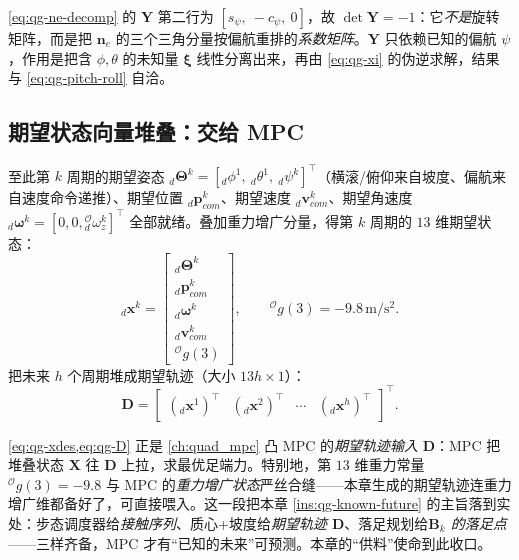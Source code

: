 \begin{note}\label{note:qg-ocr-Y}
\cref{eq:qg-ne-decomp} 的 $\mathbf{Y}$ 第二行为 $[s_\psi,\ -c_\psi,\ 0]$，故 $\det\mathbf{Y}=-1$：它\emph{不是}旋转矩阵，而是把 $\boldsymbol{n}_e$ 的三个三角分量按偏航重排的\emph{系数矩阵}。$\mathbf{Y}$ 只依赖已知的偏航 $\psi$，作用是把含 $\phi,\theta$ 的未知量 $\boldsymbol{\xi}$ 线性分离出来，再由 \cref{eq:qg-xi} 的伪逆求解，结果与 \cref{eq:qg-pitch-roll} 自洽。
\end{note}

\subsection{期望状态向量堆叠：交给 MPC}
\label{subsec:qg-stack}

至此第 $k$ 周期的期望姿态 ${}_d\boldsymbol{\Theta}^{k}=[{}_d\phi^{1},\ {}_d\theta^{1},\ {}_d\psi^{k}]^\top$（横滚/俯仰来自坡度、偏航来自速度命令递推）、期望位置 ${}_d\boldsymbol{p}_{com}^{k}$、期望速度 ${}_d\boldsymbol{v}_{com}^{k}$、期望角速度 ${}_d\boldsymbol{\omega}^{k}=[0,0,{}_d^{\mathcal{O}}\omega_z^{k}]^\top$ 全部就绪。叠加重力增广分量，得第 $k$ 周期的 $13$ 维期望状态\cite{yu2021quadruped}：
\begin{equation}
  {}_d\boldsymbol{x}^{k}=
  \begin{bmatrix}
  {}_d\boldsymbol{\Theta}^{k} \\ {}_d\boldsymbol{p}_{com}^{k} \\ {}_d\boldsymbol{\omega}^{k} \\ {}_d\boldsymbol{v}_{com}^{k} \\ {}^{\mathcal{O}}g(3)
  \end{bmatrix},
  \qquad {}^{\mathcal{O}}g(3)=-9.8\,\mathrm{m/s^2}.
  \label{eq:qg-xdes}
\end{equation}
把未来 $h$ 个周期堆成期望轨迹（大小 $13h\times1$）\cite{yu2021quadruped}：
\begin{equation}
  \mathbf{D}=\begin{bmatrix}({}_d\boldsymbol{x}^{1})^\top & ({}_d\boldsymbol{x}^{2})^\top & \cdots & ({}_d\boldsymbol{x}^{h})^\top\end{bmatrix}^\top.
  \label{eq:qg-D}
\end{equation}

\begin{insight}\label{ins:qg-handoff}
\cref{eq:qg-xdes,eq:qg-D} 正是 \cref{ch:quad_mpc} 凸 MPC 的\emph{期望轨迹输入} $\mathbf{D}$：MPC 把堆叠状态 $\mathbf{X}$ 往 $\mathbf{D}$ 上拉，求最优足端力。特别地，第 $13$ 维重力常量 ${}^{\mathcal{O}}g(3)=-9.8$ 与 MPC 的\emph{重力增广状态}严丝合缝——本章生成的期望轨迹连重力增广维都备好了，可直接喂入。这一段把本章 \cref{ins:qg-known-future} 的主旨落到实处：步态调度器给\emph{接触序列}、质心+坡度给\emph{期望轨迹 $\mathbf{D}$}、落足规划给\emph{$\mathbf{B}_k$ 的落足点}——三样齐备，MPC 才有“已知的未来”可预测。本章的“供料”使命到此收口。
\end{insight}

